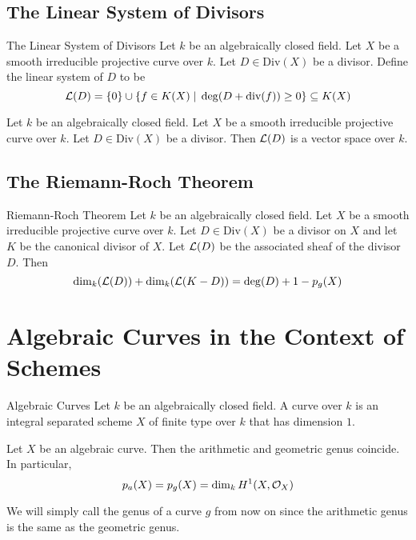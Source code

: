 \documentclass[a4paper]{article}
\begin{document}
\subsection{The Linear System of Divisors}
\begin{defn}{The Linear System of Divisors}{} Let $k$ be an algebraically closed field. Let $X$ be a smooth irreducible projective curve over $k$. Let $D\in\text{Div}(X)$ be a divisor. Define the linear system of $D$ to be $$\mathcal{L}(D)=\{0\}\cup\{f\in K(X)\;|\;\deg(D+\text{div}(f))\geq 0\}\subseteq K(X)$$
\end{defn}

\begin{lmm}{}{} Let $k$ be an algebraically closed field. Let $X$ be a smooth irreducible projective curve over $k$. Let $D\in\text{Div}(X)$ be a divisor. Then $\mathcal{L}(D)$ is a vector space over $k$. 
\end{lmm}

\subsection{The Riemann-Roch Theorem}
\begin{thm}{Riemann-Roch Theorem}{} Let $k$ be an algebraically closed field. Let $X$ be a smooth irreducible projective curve over $k$. Let $D\in\text{Div}(X)$ be a divisor on $X$ and let $K$ be the canonical divisor of $X$. Let $\mathcal{L}(D)$ be the associated sheaf of the divisor $D$. Then $$\dim_k(\mathcal{L}(D))+\dim_k(\mathcal{L}(K-D))=\deg(D)+1-p_g(X)$$
\end{thm}


\pagebreak
\section{Algebraic Curves in the Context of Schemes}
\begin{defn}{Algebraic Curves}{} Let $k$ be an algebraically closed field. A curve over $k$ is an integral separated scheme $X$ of finite type over $k$ that has dimension $1$. 
\end{defn}

\begin{prp}{}{} Let $X$ be an algebraic curve. Then the arithmetic and geometric genus coincide. In particular, $$p_a(X)=p_g(X)=\dim_kH^1(X,\mathcal{O}_X)$$
\end{prp}

We will simply call the genus of a curve $g$ from now on since the arithmetic genus is the same as the geometric genus. 
\end{document}
